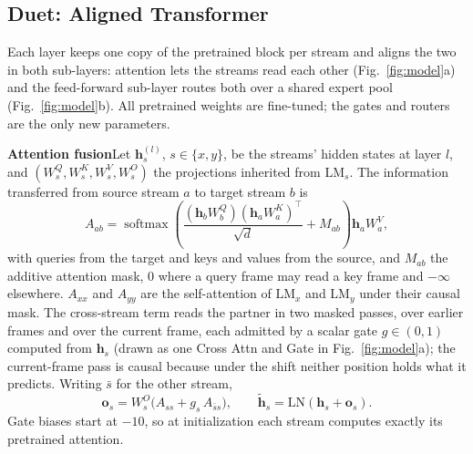 \subsection{Duet: Aligned Transformer}
\label{sec:duet}

Each layer keeps one copy of the pretrained block per stream and aligns
the two in both sub-layers: attention lets the streams read each other
(Fig.~\ref{fig:model}a) and the feed-forward sub-layer routes both over
a shared expert pool (Fig.~\ref{fig:model}b). All pretrained weights are
fine-tuned; the gates and routers are the only new parameters.

\textbf{Attention fusion}\quad Let $\bm{h}^{(l)}_s$, $s\in\{x,y\}$, be
the streams' hidden states at layer $l$, and $(W^Q_s, W^K_s, W^V_s,
W^O_s)$ the projections inherited from $\mathrm{LM}_s$. The information
transferred from source stream $a$ to target stream $b$ is
\begin{equation}
    A_{ab}
    =
    \operatorname{softmax}
    \left(
        \frac{(\bm{h}_b W^Q_b)(\bm{h}_a W^K_a)^\top}{\sqrt{d}}
        + M_{ab}
    \right)
    \bm{h}_a W^V_a,
    \label{eq:duet_attn}
\end{equation}
with queries from the target and keys and values from the source, and
$M_{ab}$ the additive attention mask, $0$ where a query frame may read
a key frame and $-\infty$ elsewhere. $A_{xx}$ and $A_{yy}$ are the
self-attention of $\mathrm{LM}_x$ and $\mathrm{LM}_y$ under their causal
mask. The cross-stream term reads the partner in two masked passes, over
earlier frames and over the current frame, each admitted by a scalar
gate $g\in(0,1)$ computed from $\bm{h}_s$ (drawn as one Cross Attn and
Gate in Fig.~\ref{fig:model}a); the current-frame pass is causal because
under the shift neither position holds what it predicts. Writing
$\bar{s}$ for the other stream,
\begin{equation}
    \bm{o}_s = W^O_s\bigl(A_{ss} + g_{s}\,A_{\bar{s}s}\bigr),
    \qquad
    \tilde{\bm{h}}_s = \mathrm{LN}(\bm{h}_s + \bm{o}_s).
    \label{eq:gates}
\end{equation}
Gate biases start at $-10$, so at initialization each stream computes
exactly its pretrained attention.

